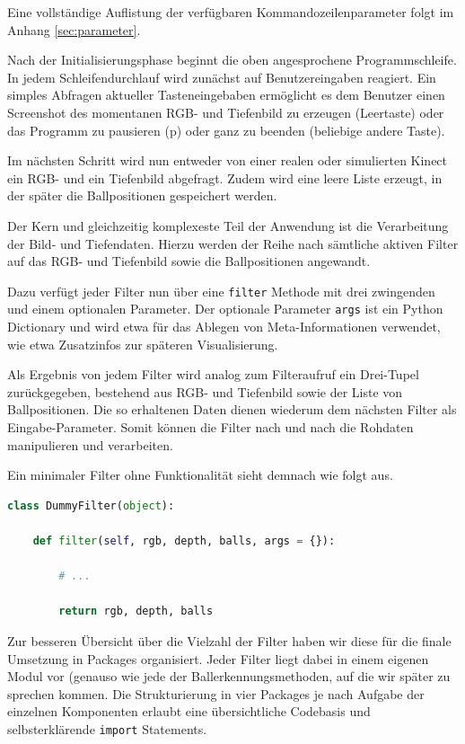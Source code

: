 \documentclass[12pt,a4paper,ngerman]{scrartcl}
\begin{document}
Eine vollständige Auflistung der verfügbaren Kommandozeilenparameter folgt im Anhang \ref{sec:parameter}.

Nach der Initialisierungsphase beginnt die oben angesprochene Programmschleife.
In jedem Schleifendurchlauf wird zunächst auf Benutzereingaben reagiert.
Ein simples Abfragen aktueller Tasteneingebaben ermöglicht es dem Benutzer einen Screenshot des momentanen RGB- und Tiefenbild zu erzeugen (Leertaste) oder das Programm zu pausieren (p) oder ganz zu beenden (beliebige andere Taste).

Im nächsten Schritt wird nun entweder von einer realen oder simulierten Kinect ein RGB- und ein Tiefenbild abgefragt. Zudem wird eine leere Liste erzeugt, in der später die Ballpositionen gespeichert werden.

Der Kern und gleichzeitig komplexeste Teil der Anwendung ist die Verarbeitung der Bild- und Tiefendaten.
Hierzu werden der Reihe nach sämtliche aktiven Filter auf das RGB- und Tiefenbild sowie die Ballpositionen angewandt.

Dazu verfügt jeder Filter nun über eine \lstinline{filter} Methode mit drei zwingenden und einem optionalen
Parameter. Der optionale Parameter \lstinline{args} ist ein Python Dictionary und wird etwa für das 
Ablegen von Meta-Informationen verwendet, wie etwa Zusatzinfos zur späteren Visualisierung.

Als Ergebnis von jedem Filter wird analog zum Filteraufruf ein Drei-Tupel zurückgegeben, bestehend aus RGB- und Tiefenbild sowie der Liste von Ballpositionen. Die so erhaltenen Daten dienen wiederum dem nächsten Filter als Eingabe-Parameter. Somit können die Filter nach und nach die Rohdaten manipulieren und verarbeiten.

Ein minimaler Filter ohne Funktionalität sieht demnach wie folgt aus.

\begin{lstlisting}[language=Python,caption={Grundstruktur eines Filters. In diesem Beispiel werden die Eingabedaten unverändert zurückgegeben.}]
class DummyFilter(object):

    def filter(self, rgb, depth, balls, args = {}):

        # ...

        return rgb, depth, balls
\end{lstlisting}

Zur besseren Übersicht über die Vielzahl der Filter haben wir diese für die finale Umsetzung in Packages organisiert. Jeder Filter liegt dabei in einem eigenen Modul vor (genauso wie jede der Ballerkennungsmethoden, auf die wir später zu sprechen kommen. Die Strukturierung in vier Packages je nach Aufgabe der einzelnen Komponenten erlaubt eine übersichtliche Codebasis und selbsterklärende \lstinline{import} Statements.
\end{document}

